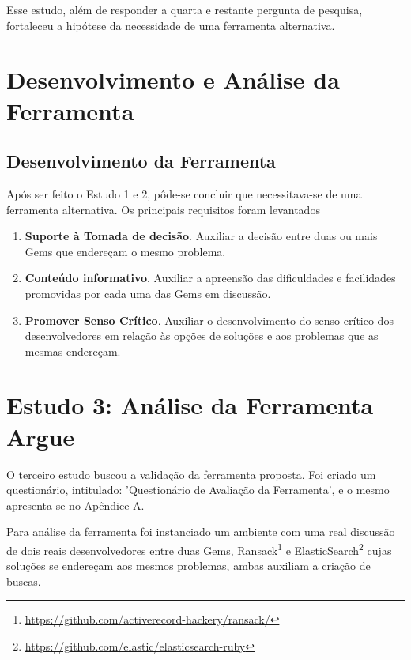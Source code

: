 Esse estudo, além de responder a quarta e restante pergunta de pesquisa, fortaleceu a hipótese da necessidade de uma ferramenta alternativa.

\section{Desenvolvimento e Análise da Ferramenta}

\subsection{Desenvolvimento da Ferramenta}

Após ser feito o Estudo 1 e 2, pôde-se concluir que necessitava-se de uma ferramenta alternativa. Os principais requisitos foram levantados

\begin{enumerate}

  \item \textbf{Suporte à Tomada de decisão}. Auxiliar a decisão entre duas ou mais Gems que endereçam o mesmo problema.
  
  \item \textbf{Conteúdo informativo}. Auxiliar a apreensão das dificuldades e facilidades promovidas por cada uma das Gems em discussão.
  
  \item \textbf{Promover Senso Crítico}. Auxiliar o desenvolvimento do senso crítico dos desenvolvedores em relação às opções de soluções e aos problemas que as mesmas endereçam.
  
\end{enumerate}

\section{Estudo 3: Análise da Ferramenta Argue}

O terceiro estudo buscou a validação da ferramenta proposta. Foi criado um questionário, intitulado: 'Questionário de Avaliação da Ferramenta', e o mesmo apresenta-se no Apêndice A.

Para análise da ferramenta foi instanciado um ambiente com uma real discussão de dois reais desenvolvedores entre duas Gems, Ransack\footnote{\url{https://github.com/activerecord-hackery/ransack/}} e ElasticSearch\footnote{\url{https://github.com/elastic/elasticsearch-ruby}} cujas soluções se endereçam aos mesmos problemas, ambas auxiliam a criação de buscas.

